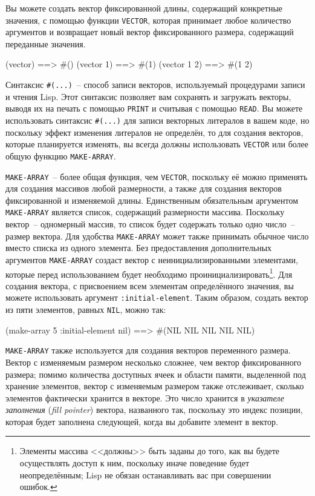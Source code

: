 Вы можете создать вектор фиксированной длины, содержащий конкретные значения, с помощью
функции \lstinline{VECTOR}, которая принимает любое количество аргументов и возвращает
новый вектор фиксированного размера, содержащий переданные значения.

\begin{myverb}
  (vector)     ==> #()
  (vector 1)   ==> #(1)
  (vector 1 2) ==> #(1 2)
\end{myverb}

Синтаксис \lstinline!#(...)!~-- способ записи векторов, используемый процедурами
записи и чтения Lisp.  Этот синтаксис позволяет вам сохранять и загружать векторы,
выводя их на печать с помощью \lstinline{PRINT} и считывая с помощью \lstinline{READ}.
Вы можете использовать синтаксис \lstinline!#(...)! для
записи векторных литералов в вашем коде, но поскольку эффект изменения литералов не определён,
то для создания векторов, которые планируется изменять, вы всегда должны 
использовать \lstinline{VECTOR} или более общую функцию \lstinline{MAKE-ARRAY}.

\lstinline{MAKE-ARRAY}~-- более общая функция, чем \lstinline{VECTOR}, поскольку её можно
применять для создания массивов любой размерности, а также для создания векторов
фиксированной и изменяемой длины. Единственным обязательным аргументом \lstinline{MAKE-ARRAY}
является список, содержащий размерности массива.  Поскольку вектор~-- одномерный массив,
то список будет содержать только одно число~-- размер вектора.  Для удобства
\lstinline{MAKE-ARRAY} может также принимать обычное число вместо списка из одного элемента.
Без предоставления дополнительных аргументов \lstinline{MAKE-ARRAY} создаст вектор с
неинициализированными элементами, которые перед использованием будет необходимо
проинициализировать\footnote{Элементы массива <<должны>> быть заданы до того, как вы будете осуществлять
  доступ к ним, поскольку иначе поведение будет неопределённым; Lisp не обязан
  останавливать вас при совершении ошибок.}.  Для создания вектора, с присвоением всем
элементам определённого значения, вы можете использовать аргумент \lstinline{:initial-element}.
Таким образом, создать вектор из пяти элементов, равных \lstinline{NIL}, можно так:

\begin{myverb}
  (make-array 5 :initial-element nil) ==> #(NIL NIL NIL NIL NIL)
\end{myverb}

\lstinline{MAKE-ARRAY} также используется для создания векторов переменного размера.
Вектор с изменяемым размером несколько сложнее, чем вектор фиксированного размера;
помимо количества доступных ячеек и области памяти, выделенной под хранение элементов,
вектор с изменяемым размером также отслеживает, сколько элементов фактически
хранится в векторе.  Это число хранится в \textit{указателе заполнения} (\textit{fill pointer})
вектора, названного так, поскольку это индекс позиции, которая будет заполнена следующей,
когда вы добавите элемент в вектор.

